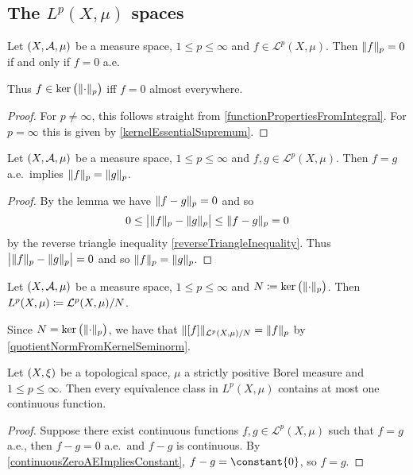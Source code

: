\subsection{The $L^p(X,\mu)$ spaces}
\begin{lemma} \label{LpEquivalenceClassesAreAE}
Let $\sSet{X,\mathcal{A},\mu}$ be a measure space, $1 \leq p \leq \infty$ and $f\in \mathcal{L}^p(X,\mu)$. Then $\lVert f\rVert_p = 0$ \textup{if and only if} $f = 0$ a.e.
\end{lemma}
Thus $f \in \ker\big(\lVert\cdot\rVert_p\big)$ iff $f = 0$ almost everywhere.
\begin{proof}
For $p \neq \infty$, this follows straight from \ref{functionPropertiesFromIntegral}. For $p = \infty$ this is given by \ref{kernelEssentialSupremum}.
\end{proof}
\begin{corollary} \label{AEEqualImpliesSamePNorm}
Let $\sSet{X,\mathcal{A},\mu}$ be a measure space, $1 \leq p \leq \infty$ and $f,g\in \mathcal{L}^p(X,\mu)$. Then $f = g$ a.e.\ implies $\lVert f\rVert_p = \lVert g\rVert_p$.
\end{corollary}
\begin{proof}
By the lemma we have $\lVert f-g\rVert_p = 0$ and so
\[ 0 \leq \big|\lVert f\rVert_p - \lVert g\rVert_p\big| \leq \lVert f-g\rVert_p = 0 \]
by the reverse triangle inequality \ref{reverseTriangleInequality}. Thus $\big|\lVert f\rVert_p - \lVert g\rVert_p\big| = 0$ and so $\lVert f\rVert_p = \lVert g\rVert_p$.
\end{proof}

\begin{definition}
Let $\sSet{X,\mathcal{A},\mu}$ be a measure space, $1 \leq p \leq \infty$ and $N \coloneqq \ker\big(\lVert\cdot\rVert_p\big)$. Then $L^p(X,\mu) \coloneqq \mathcal{L}^p(X,\mu)/N$. 
\end{definition}
Since $N = \ker\big(\lVert\cdot\rVert_p\big)$, we have that $\lVert[f]\rVert_{\mathcal{L}^p(X,\mu)/N} = \lVert f\rVert_p$ by \ref{quotientNormFromKernelSeminorm}.

\begin{proposition}
Let $\sSet{X,\xi}$ be a topological space, $\mu$ a strictly positive Borel measure and $1\leq p\leq \infty$. Then every equivalence class in $L^p(X,\mu)$ contains at most one continuous function.
\end{proposition}
\begin{proof}
Suppose there exist continuous functions $f,g\in \mathcal{L}^p(X,\mu)$ such that $f = g$ a.e., then $f-g = 0$ a.e.\ and $f-g$ is continuous. By \ref{continuousZeroAEImpliesConstant}, $f-g = \constant{0}$, so $f=g$.
\end{proof}


